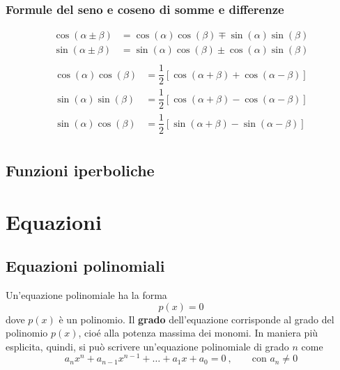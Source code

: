 \subsection{Formule del seno e coseno di somme e differenze}
\begin{equation}
\begin{aligned}
    \cos(\alpha \pm \beta) & = \cos(\alpha) \cos(\beta) \mp \sin(\alpha) \sin(\beta) \\
    \sin(\alpha \pm \beta) & = \sin(\alpha) \cos(\beta) \pm \cos(\alpha) \sin(\beta) \\
\end{aligned}
\end{equation}
\begin{equation}
\begin{aligned}
    \cos(\alpha) \cos(\beta) & = \dfrac{1}{2} \left[ \cos(\alpha + \beta) + \cos(\alpha-\beta) \right] \\
    \sin(\alpha) \sin(\beta) & = \dfrac{1}{2} \left[ \cos(\alpha + \beta) - \cos(\alpha-\beta) \right] \\
    \sin(\alpha) \cos(\beta) & = \dfrac{1}{2} \left[ \sin(\alpha + \beta) - \sin(\alpha-\beta) \right] \\
\end{aligned}
\end{equation}

\section{Funzioni iperboliche}


\chapter{Equazioni}
\section{Equazioni polinomiali}
\begin{definition} Un'equazione polinomiale ha la forma
    \begin{equation} p(x) = 0 \end{equation}
dove $p(x)$ è un polinomio.
Il \textbf{grado} dell'equazione corrisponde al grado del polinomio $p(x)$, cioé alla potenza massima dei monomi. In maniera più esplicita, quindi, si può scrivere un'equazione polinomiale di grado $n$ come
    \begin{equation}
        a_n x^n + a_{n-1} x^{n-1} + \dots + a_1 x + a_0 = 0 \ , \qquad \text{con $a_n \ne 0$}
    \end{equation}
\end{definition}

